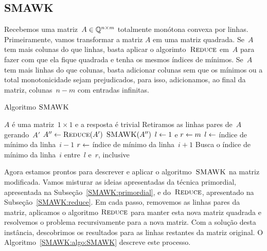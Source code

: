 
\subsection{SMAWK}
\newcommand{\SMAWK}{\textsc{SMAWK}}

Recebemos uma matriz~$A \in \mathbb{Q}^{n \times m}$ totalmente monótona convexa por linhas. Primeiramente, vamos transformar a matriz $A$ em uma matriz quadrada. Se~$A$ tem mais colunas do que linhas, basta aplicar o algorimto~$\textsc{Reduce}$ em~$A$ para fazer com que ela fique quadrada e tenha os mesmos índices de mínimos. Se~$A$ tem mais linhas do que colunas, basta adicionar colunas sem que os mínimos ou a total monotonicidade sejam prejudicados, para isso, adicionamos, ao final da matriz, colunas~$n-m$ com entradas infinitas. 

\begin{algorithm}[b]
\caption{Algoritmo $\SMAWK$}
\label{SMAWK:algo:SMAWK}
\begin{algorithmic}[1]
\Function{\SMAWK}{A}
        \State $A$ é uma matriz~$1 \times 1$ e a resposta é trivial
    \Else
        \State Retiramos as linhas pares de~$A$ gerando~$A'$
        \State $A'' \leftarrow \textsc{Reduce}(A')$
        \State $\SMAWK(A'')$
            \State $l \leftarrow 1$ e $r \leftarrow m$
                \State $l \leftarrow$ índice de mínimo da linha~$i - 1$
            \EndIf
                \State $r \leftarrow$ índice de mínimo da linha~$i + 1$
            \EndIf
            \State Busca o índice de mínimo da linha~$i$ entre~$l$ e~$r$, inclusive
        \EndFor
    \EndIf
\EndFunction
\end{algorithmic}
\end{algorithm}

Agora estamos prontos para descrever e aplicar o algoritmo~$\SMAWK$ na matriz modificada. Vamos misturar as ideias apresentadas da técnica primordial, apresentada na Subseção~\ref{SMAWK:primordial}, e do~$\textsc{Reduce}$, apresentado na Subseção~\ref{SMAWK:reduce}. Em cada passo, removemos as linhas pares da matriz, aplicamos o algoritmo $\textsc{Reduce}$ para manter esta nova matriz quadrada e resolvemos o problema recursivamente para a nova matriz. Com a solução desta instância, descobrimos os resultados para as linhas restantes da matriz original. O Algoritmo~\ref{SMAWK:algo:SMAWK} descreve este processo.

